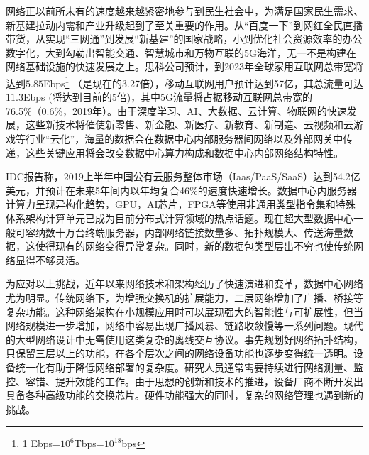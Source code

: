 
\label{chap1}


\label{chap11}
\label{chap111}


网络正以前所未有的速度越来越紧密地参与到民生社会中，为满足国家民生需求、新基建拉动内需和产业升级起到了至关重要的作用。从“百度一下”到网红全民直播带货，从实现“三网通”到发展“新基建”的国家战略，小到优化社会资源效率的办公数字化，大到勾勒出智能交通、智慧城市和万物互联的5G海洋，无一不是构建在网络基础设施的快速发展之上。思科公司预计，到2023年全球家用互联网总带宽将达到$5.85$Ebps\footnote{1 Ebps=$10^6$Tbps=$10^{18}$bps} （是现在的3.27倍），移动互联网用户预计达到57亿，其总流量可达$11.3$Ebps (将达到目前的5倍)，其中5G流量将占据移动互联网总带宽的76.5\%（0.6\%，2019年）。由于深度学习、AI、大数据、云计算、物联网的快速发展，这些新技术将催使新零售、新金融、新医疗、新教育、新制造、云视频和云游戏等行业“云化”，海量的数据会在数据中心内部服务器间网络以及外部网关中传递，这些关键应用将会改变数据中心算力构成和数据中心内部网络结构特性。

IDC报告称，2019上半年中国公有云服务整体市场（Iaas/PaaS/SaaS）达到54.2亿美元，并预计在未来5年间内以年均复合46\%的速度快速增长。数据中心内服务器计算力呈现异构化趋势，GPU，AI芯片，FPGA等使用非通用类型指令集和特殊体系架构计算单元已成为目前分布式计算领域的热点话题。现在超大型数据中心一般可容纳数十万台终端服务器，内部网络链接数量多、拓扑规模大、传送海量数据，这使得现有的网络变得异常复杂。同时，新的数据包类型层出不穷也使传统网络显得不够灵活。

为应对以上挑战，近年以来网络技术和架构经历了快速演进和变革，数据中心网络尤为明显。传统网络下，为增强交换机的扩展能力，二层网络增加了广播、桥接等复杂功能。这种网络架构在小规模应用时可以展现强大的智能性与可扩展性，但当网络规模进一步增加，网络中容易出现广播风暴、链路收敛慢等一系列问题。现代的大型网络设计中无需使用这类复杂的离线交互协议。事先规划好网络拓扑结构，只保留三层以上的功能，在各个层次之间的网络设备功能也逐步变得统一透明。设备统一化有助于降低网络部署的复杂度。研究人员通常需要持续进行网络测量、监控、容错、提升效能的工作。由于思想的创新和技术的推进，设备厂商不断开发出具备各种高级功能的交换芯片。硬件功能强大的同时，复杂的网络管理也遇到新的挑战。

